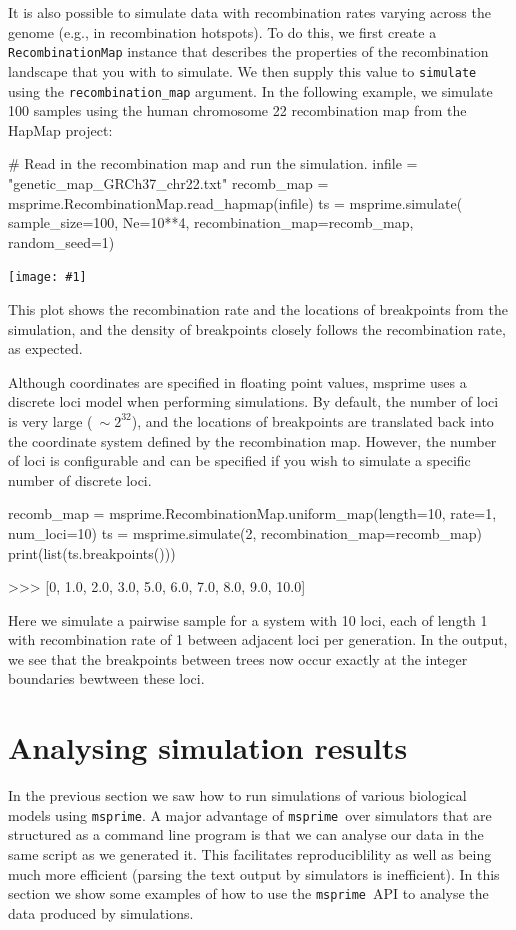 \documentclass[graybox]{svmult}
\newcommand{\msprime}[0]{\texttt{msprime}}
\newcommand{\includenbimage}[1]{\begin{center}\texttt{[image: \#1]}\end{center}}
\begin{document}
It is also possible to simulate data with recombination rates varying
across the genome (e.g., in recombination hotspots). To do this, we
first create a \texttt{RecombinationMap} instance that describes the
properties of the recombination landscape that you with to simulate. We
then supply this value to \texttt{simulate} using the
\texttt{recombination\_map} argument. In the following example, we
simulate 100 samples using the human chromosome 22 recombination map
from the HapMap project:


\begin{pythoncode}
# Read in the recombination map and run the simulation.
infile = "genetic_map_GRCh37_chr22.txt"
recomb_map = msprime.RecombinationMap.read_hapmap(infile)
ts = msprime.simulate(
    sample_size=100,
    Ne=10**4,
    recombination_map=recomb_map,
    random_seed=1)
\end{pythoncode}


\includenbimage{images/simulations_53_0.pdf}

    This plot shows the recombination rate and the locations of breakpoints
from the simulation, and the density of breakpoints closely follows the
recombination rate, as expected.

Although coordinates are specified in floating point values, msprime
uses a discrete loci model when performing simulations. By default, the
number of loci is very large (\(~\sim 2^{32}\)), and the locations of
breakpoints are translated back into the coordinate system defined by
the recombination map. However, the number of loci is configurable and
can be specified if you wish to simulate a specific number of discrete
loci.

\begin{pythoncode}
recomb_map = msprime.RecombinationMap.uniform_map(length=10, rate=1,
num_loci=10)
ts = msprime.simulate(2, recombination_map=recomb_map)
print(list(ts.breakpoints()))

>>> [0, 1.0, 2.0, 3.0, 5.0, 6.0, 7.0, 8.0, 9.0, 10.0]
\end{pythoncode}


    Here we simulate a pairwise sample for a system with 10 loci, each of
length 1 with recombination rate of 1 between adjacent loci per
generation. In the output, we see that the breakpoints between trees now
occur exactly at the integer boundaries bewtween these loci.



\section{Analysing simulation results}
\label{sec:analysing}
In the previous section we saw how to run simulations of various biological models
using \msprime. A major advantage of \msprime\ over simulators that are structured
as a command line program is that we can analyse our data in the same script
as we generated it. This facilitates reproduciblility as well as being much
more efficient (parsing the text output by simulators is inefficient). In this
section we show some examples of how to use the \msprime\ API to analyse the
data produced by simulations.
\end{document}
